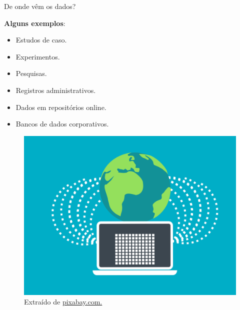 \documentclass[
  ignorenonframetext,
  serif,
  professionalfont,
  usenames,
  dvipsnames,
  aspectratio = 169]{beamer}
\providecommand{\tightlist}{%
  \setlength{\itemsep}{0pt}\setlength{\parskip}{0pt}}
\renewcommand{\tightlist}{%
  \setlength{\itemsep}{0\baselineskip}
  \setlength{\parskip}{0.25\baselineskip}
}
\def\beginAHalfColumn{\begin{minipage}{0.49\textwidth}}%
\def\endColumns{\end{minipage}}%
\begin{document}
\begin{frame}{De onde vêm os dados?}
\protect\hypertarget{de-onde-vuxeam-os-dados}{}
\beginAHalfColumn

\textbf{Alguns exemplos}:

\begin{itemize}
\tightlist
\item
  Estudos de caso.
\item
  Experimentos.
\item
  Pesquisas.
\item
  Registros administrativos.
\item
  Dados em repositórios online.
\item
  Bancos de dados corporativos.
\end{itemize}

\endColumns
\beginAHalfColumn

\begin{figure}

{\centering \includegraphics[width=0.9\linewidth]{./img/fontes-dados} 

}

\caption{Extraído de \href{https://cdn.pixabay.com/photo/2022/03/02/09/37/data-7042739_1280.png}{pixabay.com.}}\label{fig:unnamed-chunk-6}
\end{figure}

\endColumns
\end{frame}
\end{document}
